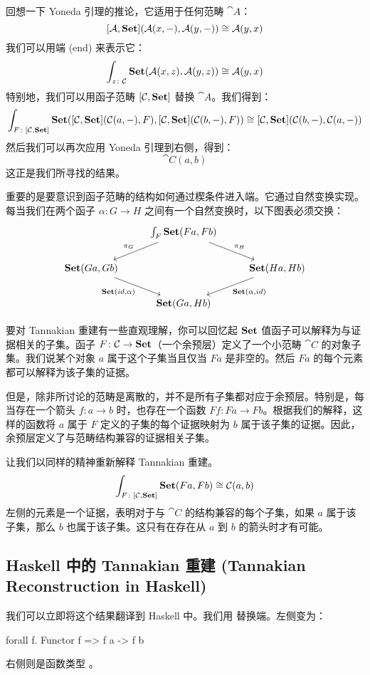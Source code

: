 \documentclass[DaoFP]{subfiles}
\begin{document}
 回想一下 Yoneda 引理的推论，它适用于任何范畴 $\cat A$：
 \[ [\mathcal{A}, \mathbf{Set}] (\mathcal{A} (x, -), \mathcal{A} (y, -)) \cong \mathcal{A} (y, x) \]
 我们可以用端 (end) 来表示它：
 \[ \int_{z \colon \mathcal{C}} \mathbf{Set} (\mathcal{A} (x, z), \mathcal{A} (y, z)) \cong \mathcal{A} (y, x) \]
 特别地，我们可以用函子范畴 $[\mathcal{C}, \mathbf{Set}]$ 替换 $\cat A$。我们得到：
 \[ \int_{F \colon [\mathcal{C}, \mathbf{Set}]} \mathbf{Set} ([\mathcal{C}, \mathbf{Set}] ( \mathcal{C} (a ,-), F), [\mathcal{C}, \mathbf{Set}] ( \mathcal{C} (b ,-), F)) \cong [\mathcal{C}, \mathbf{Set}](\mathcal{C} (b ,-), \mathcal{C} (a ,-))\]
 然后我们可以再次应用 Yoneda 引理到右侧，得到：
 \[ \cat C (a, b) \]
 这正是我们所寻找的结果。

 重要的是要意识到函子范畴的结构如何通过楔条件进入端。它通过自然变换实现。每当我们在两个函子 $\alpha \colon G \to H$ 之间有一个自然变换时，以下图表必须交换：
 \[
  \begin{tikzcd}
   & \int_F \Set (F a, F b)
   \arrow[dl, "\pi_G"']
   \arrow[dr, "\pi_H"]
   \\
   \Set(G a, G b)
   \arrow[dr, "{\Set(id, \alpha)}"']
   && \Set (H a, H b)
   \arrow[dl, "{\Set (\alpha, id)}"]
   \\
   & \Set (G a, H b)
  \end{tikzcd}
 \]

 要对 Tannakian 重建有一些直观理解，你可以回忆起 $\mathbf{Set}$ 值函子可以解释为与证据相关的子集。函子 $F \colon \mathcal{C} \to \mathbf{Set}$（一个余预层）定义了一个小范畴 $\cat C$ 的对象子集。我们说某个对象 $a$ 属于这个子集当且仅当 $F a$ 是非空的。然后 $F a$ 的每个元素都可以解释为该子集的证据。

 但是，除非所讨论的范畴是离散的，并不是所有子集都对应于余预层。特别是，每当存在一个箭头 $f \colon a \to b$ 时，也存在一个函数 $F f \colon F a \to F b$。根据我们的解释，这样的函数将 $a$ 属于 $F$ 定义的子集的每个证据映射为 $b$ 属于该子集的证据。因此，余预层定义了与范畴结构兼容的证据相关子集。

 让我们以同样的精神重新解释 Tannakian 重建。
 \[ \int_{F \colon [\mathcal{C}, \mathbf{Set}]} \mathbf{Set} (F a, F b) \cong \mathcal{C}(a, b) \]
 左侧的元素是一个证据，表明对于与 $\cat C$ 的结构兼容的每个子集，如果 $a$ 属于该子集，那么 $b$ 也属于该子集。这只有在存在从 $a$ 到 $b$ 的箭头时才有可能。

 \subsection{Haskell 中的 Tannakian 重建 (Tannakian Reconstruction in Haskell)}

 我们可以立即将这个结果翻译到 Haskell 中。我们用  替换端。左侧变为：
 \begin{haskell}
  forall f. Functor f => f a -> f b
 \end{haskell}
 右侧则是函数类型 。
\end{document}
